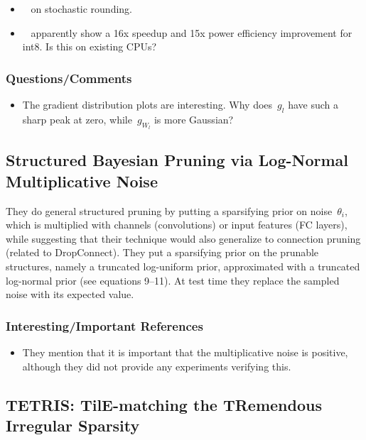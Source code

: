 \documentclass[a4paper, 12pt]{article}
\begin{document}
\begin{itemize}
        \item~\cite{gupta2015deep} on stochastic rounding.

        \item~\cite{hubara2017jmlr} apparently show a 16x speedup and 15x power
                efficiency improvement for int8. Is this on existing CPUs?
\end{itemize}

\subsubsection{Questions/Comments}

\begin{itemize}
        \item The gradient distribution plots are interesting. Why does~$g_l$
                have such a sharp peak at zero, while~$g_{W_l}$ is more
                Gaussian?
\end{itemize}


\subsection{Structured Bayesian Pruning via Log-Normal Multiplicative
            Noise~\cite{neklyudov2017structured}}

They do general structured pruning by putting a sparsifying prior on
noise~$\theta_i$, which is multiplied with channels (convolutions) or input
features (FC layers), while suggesting that their technique would also
generalize to connection pruning (related to DropConnect).
They put a sparsifying prior on the prunable structures, namely a truncated
log-uniform prior, approximated with a truncated log-normal prior (see
equations 9--11).
At test time they replace the sampled noise with its expected value.


\subsubsection{Interesting/Important References}

\begin{itemize}
        \item They mention that it is important that the multiplicative noise
                is positive, although they did not provide any experiments
                verifying this.
\end{itemize}


\subsection{TETRIS: TilE-matching the TRemendous Irregular
            Sparsity~\cite{yu2018tetris}}
\end{document}

